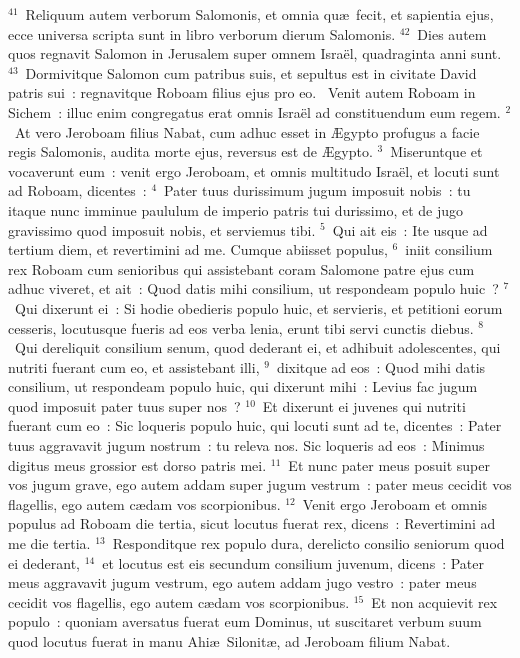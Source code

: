 ${}^{41}$~Reliquum autem verborum Salomonis, et omnia qu\ae\ fecit, et sapientia ejus, ecce universa scripta sunt in libro verborum dierum Salomonis.
${}^{42}$~Dies autem quos regnavit Salomon in Jerusalem super omnem Isra\"el, quadraginta anni sunt.
${}^{43}$~Dormivitque Salomon cum patribus suis, et sepultus est in civitate David patris sui~: regnavitque Roboam filius ejus pro eo.
~Venit autem Roboam in Sichem~: illuc enim congregatus erat omnis Isra\"el ad constituendum eum regem.
${}^{2}$~At vero Jeroboam filius Nabat, cum adhuc esset in \AE gypto profugus a facie regis Salomonis, audita morte ejus, reversus est de \AE gypto.
${}^{3}$~Miseruntque et vocaverunt eum~: venit ergo Jeroboam, et omnis multitudo Isra\"el, et locuti sunt ad Roboam, dicentes~:
${}^{4}$~Pater tuus durissimum jugum imposuit nobis~: tu itaque nunc imminue paululum de imperio patris tui durissimo, et de jugo gravissimo quod imposuit nobis, et serviemus tibi.
${}^{5}$~Qui ait eis~: Ite usque ad tertium diem, et revertimini ad me. Cumque abiisset populus,
${}^{6}$~iniit consilium rex Roboam cum senioribus qui assistebant coram Salomone patre ejus cum adhuc viveret, et ait~: Quod datis mihi consilium, ut respondeam populo huic~?
${}^{7}$~Qui dixerunt ei~: Si hodie obedieris populo huic, et servieris, et petitioni eorum cesseris, locutusque fueris ad eos verba lenia, erunt tibi servi cunctis diebus.
${}^{8}$~Qui dereliquit consilium senum, quod dederant ei, et adhibuit adolescentes, qui nutriti fuerant cum eo, et assistebant illi,
${}^{9}$~dixitque ad eos~: Quod mihi datis consilium, ut respondeam populo huic, qui dixerunt mihi~: Levius fac jugum quod imposuit pater tuus super nos~?
${}^{10}$~Et dixerunt ei juvenes qui nutriti fuerant cum eo~: Sic loqueris populo huic, qui locuti sunt ad te, dicentes~: Pater tuus aggravavit jugum nostrum~: tu releva nos. Sic loqueris ad eos~: Minimus digitus meus grossior est dorso patris mei.
${}^{11}$~Et nunc pater meus posuit super vos jugum grave, ego autem addam super jugum vestrum~: pater meus cecidit vos flagellis, ego autem c\ae dam vos scorpionibus.
${}^{12}$~Venit ergo Jeroboam et omnis populus ad Roboam die tertia, sicut locutus fuerat rex, dicens~: Revertimini ad me die tertia.
${}^{13}$~Responditque rex populo dura, derelicto consilio seniorum quod ei dederant,
${}^{14}$~et locutus est eis secundum consilium juvenum, dicens~: Pater meus aggravavit jugum vestrum, ego autem addam jugo vestro~: pater meus cecidit vos flagellis, ego autem c\ae dam vos scorpionibus.
${}^{15}$~Et non acquievit rex populo~: quoniam aversatus fuerat eum Dominus, ut suscitaret verbum suum quod locutus fuerat in manu Ahi\ae\ Silonit\ae , ad Jeroboam filium Nabat.


